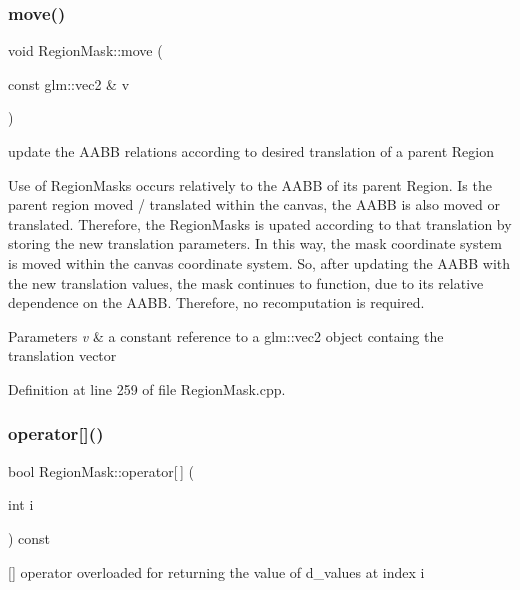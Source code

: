 \subsubsection{\texorpdfstring{move()}{move()}}
{\footnotesize\ttfamily void Region\+Mask\+::move (\begin{DoxyParamCaption}\item[{const glm\+::vec2 \&}]{v }\end{DoxyParamCaption})}



update the A\+A\+BB relations according to desired translation of a parent Region 

Use of Region\+Masks occurs relatively to the A\+A\+BB of its parent Region. Is the parent region moved / translated within the canvas, the A\+A\+BB is also moved or translated. Therefore, the Region\+Masks is upated according to that translation by storing the new translation parameters. In this way, the mask coordinate system is moved within the canvas coordinate system. So, after updating the A\+A\+BB with the new translation values, the mask continues to function, due to its relative dependence on the A\+A\+BB. Therefore, no recomputation is required.


\begin{DoxyParams}{Parameters}
{\em v} & a constant reference to a glm\+::vec2 object containg the translation vector \\
\hline
\end{DoxyParams}


Definition at line 259 of file Region\+Mask.\+cpp.

\mbox{\label{class_region_mask_af1fb7eddccb93181719616e6cbb5f6c9}} 
\subsubsection{\texorpdfstring{operator[]()}{operator[]()}\hspace{0.1cm}{\footnotesize\ttfamily [1/2]}}
{\footnotesize\ttfamily bool Region\+Mask\+::operator\mbox{[}$\,$\mbox{]} (\begin{DoxyParamCaption}\item[{int}]{i }\end{DoxyParamCaption}) const}



\mbox{[}\mbox{]} operator overloaded for returning the value of d\+\_\+values at index i 

